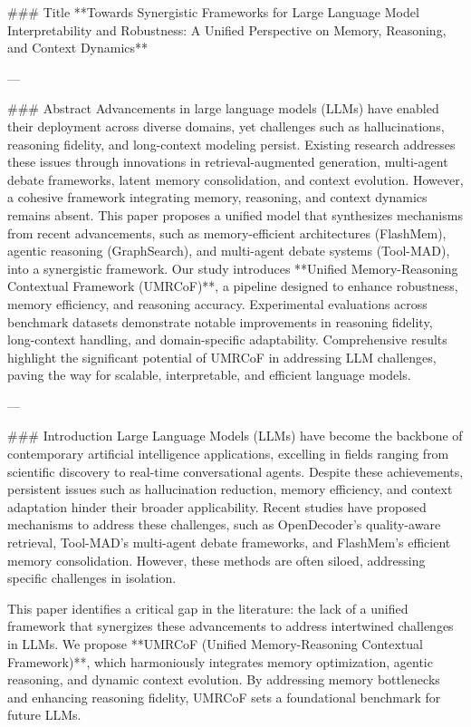 ### Title  
**Towards Synergistic Frameworks for Large Language Model Interpretability and Robustness: A Unified Perspective on Memory, Reasoning, and Context Dynamics**

---

### Abstract  
Advancements in large language models (LLMs) have enabled their deployment across diverse domains, yet challenges such as hallucinations, reasoning fidelity, and long-context modeling persist. Existing research addresses these issues through innovations in retrieval-augmented generation, multi-agent debate frameworks, latent memory consolidation, and context evolution. However, a cohesive framework integrating memory, reasoning, and context dynamics remains absent. This paper proposes a unified model that synthesizes mechanisms from recent advancements, such as memory-efficient architectures (FlashMem), agentic reasoning (GraphSearch), and multi-agent debate systems (Tool-MAD), into a synergistic framework. Our study introduces **Unified Memory-Reasoning Contextual Framework (UMRCoF)**, a pipeline designed to enhance robustness, memory efficiency, and reasoning accuracy. Experimental evaluations across benchmark datasets demonstrate notable improvements in reasoning fidelity, long-context handling, and domain-specific adaptability. Comprehensive results highlight the significant potential of UMRCoF in addressing LLM challenges, paving the way for scalable, interpretable, and efficient language models.

---

### Introduction  
Large Language Models (LLMs) have become the backbone of contemporary artificial intelligence applications, excelling in fields ranging from scientific discovery to real-time conversational agents. Despite these achievements, persistent issues such as hallucination reduction, memory efficiency, and context adaptation hinder their broader applicability. Recent studies have proposed mechanisms to address these challenges, such as OpenDecoder’s quality-aware retrieval, Tool-MAD’s multi-agent debate frameworks, and FlashMem’s efficient memory consolidation. However, these methods are often siloed, addressing specific challenges in isolation.

This paper identifies a critical gap in the literature: the lack of a unified framework that synergizes these advancements to address intertwined challenges in LLMs. We propose **UMRCoF (Unified Memory-Reasoning Contextual Framework)**, which harmoniously integrates memory optimization, agentic reasoning, and dynamic context evolution. By addressing memory bottlenecks and enhancing reasoning fidelity, UMRCoF sets a foundational benchmark for future LLMs.

